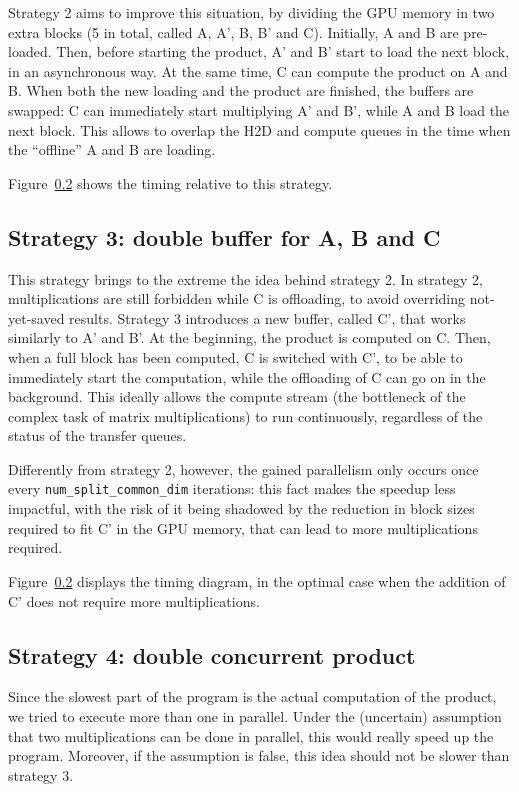 Strategy 2 aims to improve this situation, by dividing the GPU memory in two extra blocks (5 in total, called A, A', B, B' and C).
Initially, A and B are pre-loaded.
Then, before starting the product, A' and B' start to load the next block, in an asynchronous way.
At the same time, C can compute the product on A and B.
When both the new loading and the product are finished, the buffers are swapped: C can immediately start multiplying A' and B', while A and B load the next block.
This allows to overlap the H2D and compute queues in the time when the ``offline'' A and B are loading.

Figure~\ref{} shows the timing relative to this strategy.

\subsection{Strategy 3: double buffer for A, B and C}

This strategy brings to the extreme the idea behind strategy 2.
In strategy 2, multiplications are still forbidden while C is offloading, to avoid overriding not-yet-saved results.
Strategy 3 introduces a new buffer, called C', that works similarly to A' and B'.
At the beginning, the product is computed on C.
Then, when a full block has been computed, C is switched with C', to be able to immediately start the computation, while the offloading of C can go on in the background.
This ideally allows the compute stream (the bottleneck of the complex task of matrix multiplications) to run continuously, regardless of the status of the transfer queues.

Differently from strategy 2, however, the gained parallelism only occurs once every \texttt{num\_split\_common\_dim} iterations: this fact makes the speedup less impactful, with the risk of it being shadowed by the reduction in block sizes required to fit C' in the GPU memory, that can lead to more multiplications required.

Figure~\ref{} displays the timing diagram, in the optimal case when the addition of C' does not require more multiplications.

\subsection{Strategy 4: double concurrent product}

Since the slowest part of the program is the actual computation of the product, we tried to execute more than one in parallel.
Under the (uncertain) assumption that two multiplications can be done in parallel, this would really speed up the program.
Moreover, if the assumption is false, this idea should not be slower than strategy 3.

